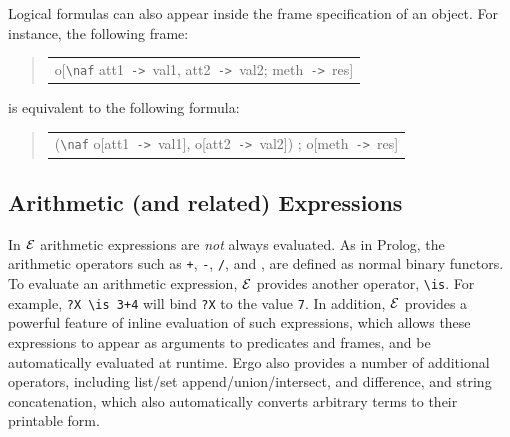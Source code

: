 \documentclass[11pt]{article}
\newcommand{\ERGO}{\mbox{\ensuremath{\cal{E}}\smaller{{\sc{RGO}}}}\xspace}
\newcommand{\FLSYSTEM}{\ERGO}
\newenvironment{qrules}{\begin{quote}\tt\begin{tabular}[t]{l}}%
{\end{tabular}\end{quote}}
\newcommand{\mvd}{{\mbox{\tt \,->\,}}}  %
\newcommand{\bs}{\textbackslash}
\newcommand{\RULELOGNAF}{{\texttt{{\bs}naf}}\xspace}
\begin{document}
%
Logical formulas can also appear inside the frame specification of an object. For
instance, the following frame:
\begin{qrules}
o[\RULELOGNAF att1{\mvd}val1, att2{\mvd}val2; meth{\mvd}res]
\end{qrules}
is equivalent to the following formula:
\begin{qrules}
(\RULELOGNAF o[att1{\mvd}val1], o[att2{\mvd}val2]) ; o[meth{\mvd}res]
\end{qrules}


\subsection{Arithmetic (and related) Expressions}\label{sec-arith-expr}


In \FLSYSTEM arithmetic expressions are \emph{not} always evaluated. As in
Prolog, the arithmetic operators such as {\tt +}, {\tt -}, {\tt /}, and
{\tt *}, are defined as normal binary functors. To evaluate an arithmetic
expression, \FLSYSTEM provides another operator, {\tt \bs{}is}.
For example, {\tt ?X \bs{}is 3+4} will bind {\tt ?X} to the value {\tt 7}.
In addition, \ERGO provides a powerful feature of inline evaluation
of such expressions, which allows these expressions to appear as arguments
to predicates and frames, and be automatically evaluated at runtime.
Ergo also provides a number of additional operators, including
list/set append/union/intersect, and difference, and
string concatenation, which also
automatically converts arbitrary terms to their printable form.
\end{document}
